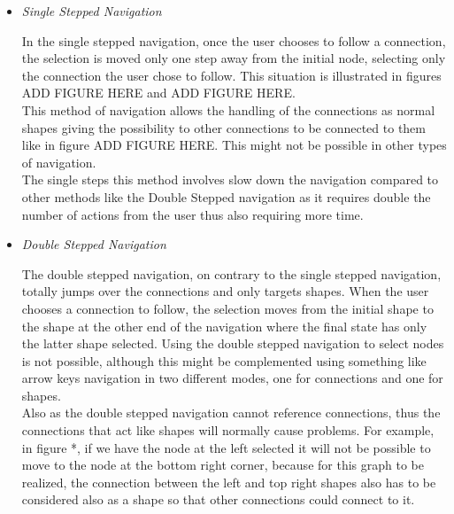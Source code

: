 \begin{itemize}
\item {\it Single Stepped Navigation}
\par \noindent
In the single stepped navigation, once the user chooses to follow a connection, the selection is moved only one step away from the initial node, selecting only the connection the user chose to follow. This situation is illustrated in figures ADD FIGURE HERE and ADD FIGURE HERE.\\
This method of navigation allows the handling of the connections as normal shapes giving the possibility to other connections to be connected to them like in figure ADD FIGURE HERE. This might not be possible in other types of navigation.\\
The single steps this method involves slow down the navigation compared to other methods like the Double Stepped navigation as it requires double the number of actions from the user thus also requiring more time.


\item {\it Double Stepped Navigation}
\par \noindent
The double stepped navigation, on contrary to the single stepped navigation, totally jumps over the connections and only targets shapes. When the user chooses a connection to follow, the selection moves from the initial shape to the shape at the other end of the navigation where the final state has only the latter shape selected. Using the double stepped navigation to select nodes is not possible, although this might be complemented using something like arrow keys navigation in two different modes, one for connections and one for shapes.\\
Also as the double stepped navigation cannot reference connections, thus the connections that act like shapes will normally cause problems. For example, in figure *, if we have the node at the left selected it will not be possible to move to the node at the bottom right corner, because for this graph to be realized, the connection between the left and top right shapes also has to be considered also as a shape so that other connections could connect to it.


\end{itemize}
